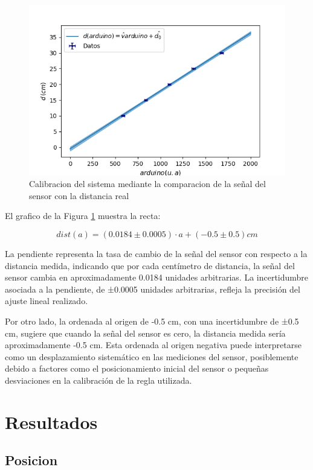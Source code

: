 \documentclass[12pt,a4]{article}
\begin{document}
\begin{figure}[H]
    \centering
    \includegraphics[width=0.8\linewidth]{Calibracion.png}
    \caption{Calibracion del sistema mediante la comparacion de la señal del sensor con la distancia real}
    \label{fig:calibracion}
\end{figure}

El grafico de la Figura \ref{fig:calibracion} muestra la recta:

\begin{equation}
    dist(a) = (0.0184 \pm 0.0005) \cdot a + (-0.5 \pm 0.5) cm
    \label{eq:dist}
\end{equation}

La pendiente representa la tasa de cambio de la señal del sensor con respecto a la distancia medida, indicando que por cada centímetro de distancia, la señal del sensor cambia en
 aproximadamente 0.0184 unidades arbitrarias. La incertidumbre asociada a la pendiente, de ±0.0005 unidades arbitrarias, refleja la precisión del ajuste lineal realizado.


Por otro lado, la ordenada al origen de -0.5 cm, con una incertidumbre de ±0.5 cm, sugiere que cuando la señal del sensor es cero, la distancia medida sería aproximadamente -0.5 cm.
 Esta ordenada al origen negativa puede interpretarse como un desplazamiento sistemático en las mediciones del sensor, posiblemente debido a factores como el posicionamiento inicial 
 del sensor o pequeñas desviaciones en la calibración de la regla utilizada.

\section{Resultados}

\subsection{Posicion}
\end{document}
